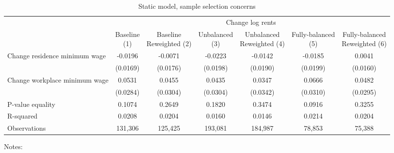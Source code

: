 \begin{table}
    \caption{Static model, sample selection concerns}
    \label{tab:static_sample}

    \begin{tabular}{@{}lcccccc@{}}
        \toprule
                                             & \multicolumn{6}{c}{Change log rents}                                     \\ \cmidrule(l){2-7} 
                                             & \shortstack{Baseline\\(1)}       & \shortstack{Baseline\\Reweighted (2)}
                                             & \shortstack{Unbalanced\\(3)}     & \shortstack{Unbalanced\\Reweighted (4)}
                                             & \shortstack{Fully-balanced\\(5)} & \shortstack{Fully-balanced\\Reweighted (6)}  \\ \midrule
        Change residence minimum wage        & -0.0196      & -0.0071        & -0.0223       & -0.0142      & -0.0185     & 0.0041            \\
                                             & (0.0169)    & (0.0176)      & (0.0198)     & (0.0190)    & (0.0199)   & (0.0160)          \\
        Change workplace minimum wage        & 0.0531      & 0.0455        & 0.0435       & 0.0347      & 0.0666     & 0.0482            \\
                                             & (0.0284)    & (0.0304)      & (0.0304)     & (0.0342)    & (0.0310)   & (0.0295)          \\ \midrule
        P-value equality                     & 0.1074      & 0.2649        & 0.1820       & 0.3474      & 0.0916     & 0.3255            \\
        R-squared                            & 0.0208      & 0.0204        & 0.0160       & 0.0146      & 0.0214     & 0.0204            \\
        Observations                         & 131,306     & 125,425       & 193,081      & 184,987     & 78,853    & 75,388           \\ \bottomrule
    \end{tabular}

    \begin{minipage}{.95\textwidth} \footnotesize
        \vspace{2mm}
        Notes: 
    \end{minipage}
\end{table}
